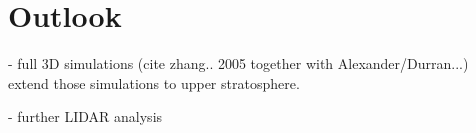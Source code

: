 

\chapter{Outlook}

- full 3D simulations (cite zhang.. 2005 together with Alexander/Durran...) extend those simulations to upper stratosphere.

- further LIDAR analysis

